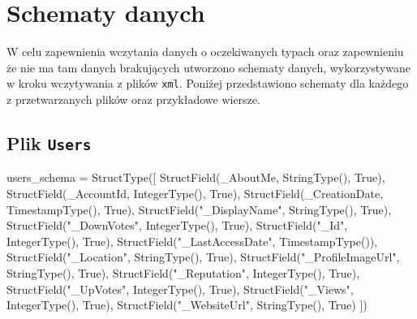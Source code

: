 \documentclass[
  letterpaper,
  DIV=11,
  numbers=noendperiod]{scrreprt}
\newenvironment{Shaded}{\begin{snugshade}}{\end{snugshade}}
\newcommand{\NormalTok}[1]{\textcolor[rgb]{0.00,0.23,0.31}{#1}}
\newcommand{\OperatorTok}[1]{\textcolor[rgb]{0.37,0.37,0.37}{#1}}
\newcommand{\StringTok}[1]{\textcolor[rgb]{0.13,0.47,0.30}{#1}}
\newcommand{\VariableTok}[1]{\textcolor[rgb]{0.07,0.07,0.07}{#1}}
\begin{document}
\normalsize

\hypertarget{schematy-danych}{%
\section{Schematy danych}\label{schematy-danych}}

W celu zapewnienia wczytania danych o oczekiwanych typach oraz
zapewnieniu że nie ma tam danych brakujących utworzono schematy danych,
wykorzystywane w kroku wczytywania z plików \texttt{xml}. Poniżej
przedstawiono schematy dla każdego z przetwarzanych plików oraz
przykładowe wiersze.

\hypertarget{plik-users}{%
\subsection{\texorpdfstring{Plik
\texttt{Users}}{Plik Users}}\label{plik-users}}

\small

\begin{Shaded}
\begin{Highlighting}[]
\NormalTok{users\_schema }\OperatorTok{=}\NormalTok{ StructType([}
\NormalTok{    StructField(}\StringTok{\textquotesingle{}\_AboutMe\textquotesingle{}}\NormalTok{, StringType(), }\VariableTok{True}\NormalTok{),}
\NormalTok{    StructField(}\StringTok{\textquotesingle{}\_AccountId\textquotesingle{}}\NormalTok{, IntegerType(), }\VariableTok{True}\NormalTok{),}
\NormalTok{    StructField(}\StringTok{\textquotesingle{}\_CreationDate\textquotesingle{}}\NormalTok{, TimestampType(), }\VariableTok{True}\NormalTok{),}
\NormalTok{    StructField(}\StringTok{"\_DisplayName"}\NormalTok{, StringType(), }\VariableTok{True}\NormalTok{),}
\NormalTok{    StructField(}\StringTok{"\_DownVotes"}\NormalTok{, IntegerType(), }\VariableTok{True}\NormalTok{),}
\NormalTok{    StructField(}\StringTok{"\_Id"}\NormalTok{, IntegerType(), }\VariableTok{True}\NormalTok{),}
\NormalTok{    StructField(}\StringTok{"\_LastAccessDate"}\NormalTok{, TimestampType()),}
\NormalTok{    StructField(}\StringTok{"\_Location"}\NormalTok{, StringType(), }\VariableTok{True}\NormalTok{),}
\NormalTok{    StructField(}\StringTok{"\_ProfileImageUrl"}\NormalTok{, StringType(), }\VariableTok{True}\NormalTok{),}
\NormalTok{    StructField(}\StringTok{"\_Reputation"}\NormalTok{, IntegerType(), }\VariableTok{True}\NormalTok{),}
\NormalTok{    StructField(}\StringTok{"\_UpVotes"}\NormalTok{, IntegerType(), }\VariableTok{True}\NormalTok{),}
\NormalTok{    StructField(}\StringTok{"\_Views"}\NormalTok{, IntegerType(), }\VariableTok{True}\NormalTok{),}
\NormalTok{    StructField(}\StringTok{"\_WebsiteUrl"}\NormalTok{, StringType(), }\VariableTok{True}\NormalTok{)}
\NormalTok{])}
\end{Highlighting}
\end{Shaded}
\end{document}
